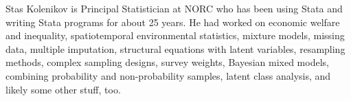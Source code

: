 


\begin{aboutauthors}
Stas Kolenikov is Principal Statistician at NORC who has been
using Stata and writing Stata programs for about 25 years.
He had worked on economic welfare and inequality, spatiotemporal
environmental statistics, mixture models, missing data,
multiple imputation, structural equations with latent variables,
resampling methods, complex sampling designs, survey weights,
Bayesian mixed models, combining probability and non-probability samples,
latent class analysis, and likely some other stuff, too.
\end{aboutauthors}

\endinput
